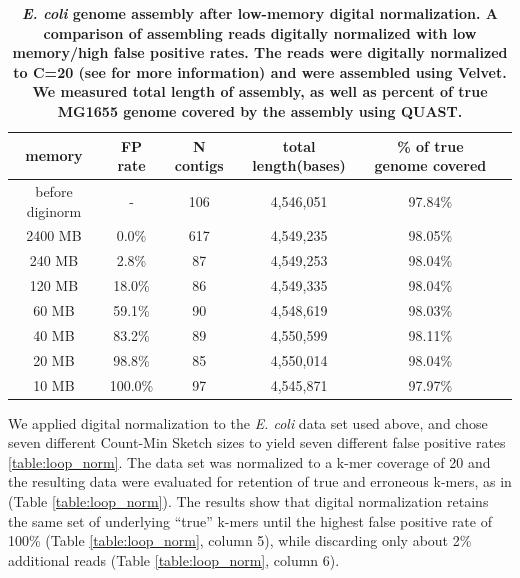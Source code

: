 \begin{table}[!ht]
\caption{
\bf{{\em E. coli} genome assembly after low-memory digital normalization.
  A comparison of assembling reads digitally normalized with low memory/high
  false positive rates.  The reads were digitally normalized to 
  C=20 (see
  \cite{Brown2012} for more information) and were assembled using Velvet.
  We measured total length of assembly,
  as well as percent of true MG1655 genome covered by the assembly using QUAST.}}
\begin{tabular}{ | c | c | c | c | c | c |}
\hline
memory   & FP rate & N contigs & total length(bases) & \% of true genome covered \\
\hline
before diginorm  &-   & 106 & 4,546,051 & 97.84\% \\
    2400 MB  &  0.0\% & 617 & 4,549,235 & 98.05\% \\
     240 MB  &  2.8\% &  87 & 4,549,253 & 98.04\% \\
     120 MB  & 18.0\% &  86 & 4,549,335 & 98.04\% \\
      60 MB  & 59.1\% &  90 & 4,548,619 & 98.03\% \\
      40 MB  & 83.2\% &  89 & 4,550,599 & 98.11\% \\
      20 MB  & 98.8\% &  85 & 4,550,014 & 98.04\% \\
      10 MB  &100.0\% &  97 & 4,545,871 & 97.97\% \\
\end{tabular}
\begin{flushleft}
\end{flushleft}
\label{table:assembly}
\end{table}

We applied digital normalization to the {\em E. coli} data set used above, and
chose seven different Count-Min Sketch sizes to yield seven different false
positive rates \ref{table:loop_norm}.  The data set was normalized to a k-mer
coverage of 20 and the resulting data were evaluated for retention of true and
erroneous k-mers, as in \cite{Brown2012} (Table \ref{table:loop_norm}).  The
results show that digital normalization retains the same set of underlying
``true'' k-mers until the highest false positive rate of 100\% (Table
\ref{table:loop_norm}, column 5), while discarding only about 2\% additional
reads (Table \ref{table:loop_norm}, column 6).

